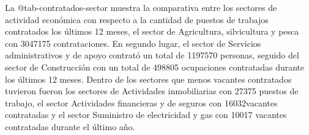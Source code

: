 \documentclass[
  11pt,
]{article}
\begin{document}
\begin{table}

\caption{\label{tbl-contratados_u12}Contratados últimos 12 meses, por
ocupación.}


\end{table}%

\FloatBarrier

La @tab-contratados-sector muestra la comparativa entre los sectores de
actividad económica con respecto a la cantidad de puestos de trabajos
contratados los últimos 12 meses, el sector de Agricultura, silvicultura
y pesca con 3047175 contrataciones. En segundo lugar, el sector de
Servicios administrativos y de apoyo contrató un total de 1197570
personas, seguido del sector de Construcción con un total de 498805
ocupaciones contratadas durante los últimos 12 meses. Dentro de los
sectores que menos vacantes contratados tuvieron fueron los sectores de
Actividades inmobiliarias con 27375 puestos de trabajo, el sector
Actividades financieras y de seguros con 16032vacantes contratadas y el
sector Suministro de electricidad y gas con 10017 vacantes contratadas
durante el último año.
\end{document}
